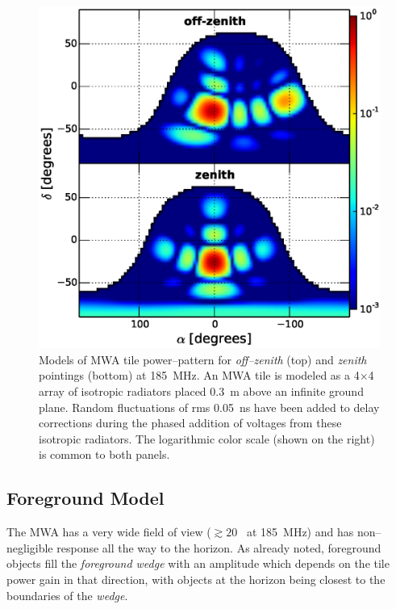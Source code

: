 \documentclass[preprint2,iop,numberedappendix]{emulateapj}
\begin{document}
\begin{figure}[htb]
\centering
\includegraphics[width=\linewidth]{figures/v1_0/delta_array_powerpattern_0.3m_ground_custom.eps}
\caption{Models of MWA tile power--pattern for {\it off--zenith} (top) and {\it zenith} pointings (bottom) at 185~MHz. An MWA tile is modeled as a 4$\times$4 array of isotropic radiators placed 0.3~m above an infinite ground plane. Random fluctuations of rms 0.05~ns have been added to delay corrections during the phased addition of voltages from these isotropic radiators. The logarithmic color scale (shown on the right) is common to both panels. \label{fig:power_pattern}}
\end{figure}

\subsection{Foreground Model}\label{sec:foreground}

The MWA has a very wide field of view ($\gtrsim 20$\arcdeg~ at 185~MHz) and has non--negligible response all the way to the horizon. As already noted, foreground objects fill the {\it foreground wedge} with an amplitude which depends on the tile power gain in that direction, with objects at the horizon being closest to the boundaries of the {\it wedge}. 
\end{document}
